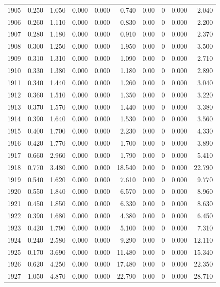 \documentclass[
]{scrartcl}
\begin{document}
\begin{longtable}{rrrrrrrrrr}
1905 & 0.250 & 1.050 & 0.000 & 0.000 & 0.740 & 0.00 & 0 & 0.000 & 2.040 \\ 
1906 & 0.260 & 1.110 & 0.000 & 0.000 & 0.830 & 0.00 & 0 & 0.000 & 2.200 \\ 
1907 & 0.280 & 1.180 & 0.000 & 0.000 & 0.910 & 0.00 & 0 & 0.000 & 2.370 \\ 
1908 & 0.300 & 1.250 & 0.000 & 0.000 & 1.950 & 0.00 & 0 & 0.000 & 3.500 \\ 
1909 & 0.310 & 1.310 & 0.000 & 0.000 & 1.090 & 0.00 & 0 & 0.000 & 2.710 \\ 
1910 & 0.330 & 1.380 & 0.000 & 0.000 & 1.180 & 0.00 & 0 & 0.000 & 2.890 \\ 
1911 & 0.340 & 1.440 & 0.000 & 0.000 & 1.260 & 0.00 & 0 & 0.000 & 3.040 \\ 
1912 & 0.360 & 1.510 & 0.000 & 0.000 & 1.350 & 0.00 & 0 & 0.000 & 3.220 \\ 
1913 & 0.370 & 1.570 & 0.000 & 0.000 & 1.440 & 0.00 & 0 & 0.000 & 3.380 \\ 
1914 & 0.390 & 1.640 & 0.000 & 0.000 & 1.530 & 0.00 & 0 & 0.000 & 3.560 \\ 
1915 & 0.400 & 1.700 & 0.000 & 0.000 & 2.230 & 0.00 & 0 & 0.000 & 4.330 \\ 
1916 & 0.420 & 1.770 & 0.000 & 0.000 & 1.700 & 0.00 & 0 & 0.000 & 3.890 \\ 
1917 & 0.660 & 2.960 & 0.000 & 0.000 & 1.790 & 0.00 & 0 & 0.000 & 5.410 \\ 
1918 & 0.770 & 3.480 & 0.000 & 0.000 & 18.540 & 0.00 & 0 & 0.000 & 22.790 \\ 
1919 & 0.540 & 1.620 & 0.000 & 0.000 & 7.610 & 0.00 & 0 & 0.000 & 9.770 \\ 
1920 & 0.550 & 1.840 & 0.000 & 0.000 & 6.570 & 0.00 & 0 & 0.000 & 8.960 \\ 
1921 & 0.450 & 1.850 & 0.000 & 0.000 & 6.330 & 0.00 & 0 & 0.000 & 8.630 \\ 
1922 & 0.390 & 1.680 & 0.000 & 0.000 & 4.380 & 0.00 & 0 & 0.000 & 6.450 \\ 
1923 & 0.420 & 1.790 & 0.000 & 0.000 & 5.100 & 0.00 & 0 & 0.000 & 7.310 \\ 
1924 & 0.240 & 2.580 & 0.000 & 0.000 & 9.290 & 0.00 & 0 & 0.000 & 12.110 \\ 
1925 & 0.170 & 3.690 & 0.000 & 0.000 & 11.480 & 0.00 & 0 & 0.000 & 15.340 \\ 
1926 & 0.620 & 4.250 & 0.000 & 0.000 & 17.480 & 0.00 & 0 & 0.000 & 22.350 \\ 
1927 & 1.050 & 4.870 & 0.000 & 0.000 & 22.790 & 0.00 & 0 & 0.000 & 28.710 \\ 

\end{longtable}
\end{document}

